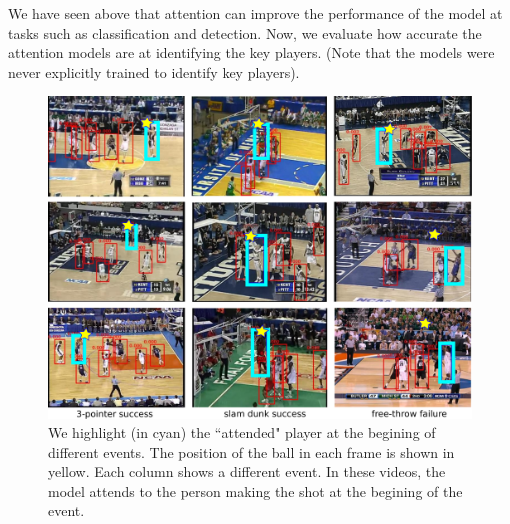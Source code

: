 We have seen above that attention can improve the performance of the
model at tasks such as classification and detection. 
Now, we evaluate how accurate the attention models are at
identifying the key players. (Note that the models were never
explicitly trained to identify key players).



\begin{figure}[t!]
\begin{center}
   \includegraphics[width=0.90\linewidth]{images/visual_examples_v2.pdf}
\end{center}
   \caption{We highlight (in cyan) the ``attended" player at the begining of different events.
     The position of the ball in each frame is shown in yellow.
   Each column shows a different event. In these videos, the model attends
 to the person making the shot at the begining of the event.}
\label{fig:visual_attention}
\end{figure}

